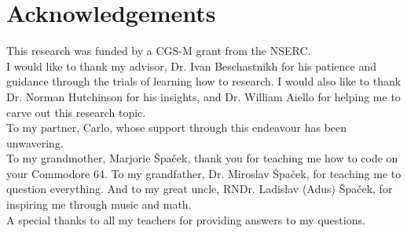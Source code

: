 
\chapter{Acknowledgements}

This research was funded by a \ac{CGS-M} grant from the \ac{NSERC}.\\

I would like to thank my advisor, Dr. Ivan Beschastnikh for his patience and guidance through the trials of learning how to research. I would also like to thank Dr. Norman Hutchinson for his insights, and Dr. William Aiello for helping me to carve out this research topic.\\

To my partner, Carlo, whose support through this endeavour has been unwavering.\\


To my grandmother, Marjorie \v{S}pa\v{c}ek, thank you for teaching me how to code on your Commodore 64.  To my grandfather, Dr. Miroslav \v{S}pa\v{c}ek, for teaching me to question everything. And to my great uncle, RNDr. Ladislav (Adus) \v{S}pa\v{c}ek, for inspiring me through music and math.\\

A special thanks to all my teachers for providing answers to my questions.

